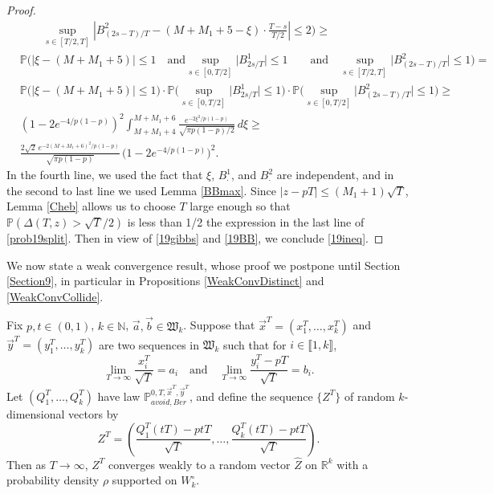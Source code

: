 \begin{proof}
\begin{equation}
\begin{split}
	&\qquad  \sup_{s\in[T/2,T]}\left|B^2_{(2s-T)/T}-(M+M_1+5-\xi)\cdot\frac{T-s}{T/2}\right| \leq 2 \bigg) \geq \\
	& \mathbb{P}\bigg(|\xi - (M+M_1+5)|\leq 1 \quad\mathrm{and} \sup_{s\in[0,T/2]}\big|B^1_{2s/T}\big| \leq 1 \qquad \mathrm{and}\quad \sup_{s\in[T/2,T]}\big|B^2_{(2s-T)/T}\big| \leq 1 \bigg) =\\
	& \mathbb{P}\Big(|\xi-(M+M_1+5)|\leq 1\Big)\cdot \mathbb{P}\bigg(\sup_{s\in[0,T/2]} \big|B^1_{2s/T}\big|\leq 1\bigg)\cdot \mathbb{P}\bigg(\sup_{s\in[0,T/2]} \big|B^2_{(2s-T)/T}\big|\leq 1\bigg) \geq\\
	& \left(1-2e^{-4/p(1-p)}\right)^2 \int_{M+M_1+4}^{M+M_1+6} \frac{e^{-2\xi^2/p(1-p)}}{\sqrt{\pi p(1-p)/2}}\,d\xi \geq\\
	& \frac{2\sqrt{2}\,e^{-2(M+M_1+6)^2/p(1-p)}}{\sqrt{\pi p(1-p)}}\,\big(1-2e^{-4/p(1-p)}\big)^2.
	\end{split}
	\end{equation}
	In the fourth line, we used the fact that $\xi$, $B^1_\cdot$, and $B^2_\cdot$ are independent, and in the second to last line we used Lemma \ref{BBmax}. Since $|z-pT|\leq (M_1+1)\sqrt{T}$, Lemma \ref{Cheb} allows us to choose $T$ large enough so that $\mathbb{P}(\Delta(T,z) > \sqrt{T}/2)$ is less than 1/2 the expression in the last line of \eqref{prob19split}. Then in view of \eqref{19gibbs} and \eqref{19BB}, we conclude \eqref{19ineq}.
	
\end{proof}

We now state a weak convergence result, whose proof we postpone until Section \ref{Section9}, in particular in Propositions \ref{WeakConvDistinct} and \ref{WeakConvCollide}.

\begin{lemma}\label{prob17}
Fix $p,t\in(0,1)$, $k\in\mathbb{N}$, $\vec a, \vec b\in \mathfrak{W}_k$.  Suppose that $\vec{x}^{T}=(x_{1}^{T},\dots,x_{k}^{T})$ and $\vec{y}^{T}=(y_{1}^{T},\dots,y_{k}^{T})$ are two sequences in $\mathfrak{W}_k$ such that for $i\in \llbracket 1,k\rrbracket$, $$\lim_{T\rightarrow\infty}\frac{x_{i}^{T}}{\sqrt{T}}=a_{i} \quad \text{and} \quad \lim_{T\rightarrow\infty}\frac{y_{i}^{T}-pT}{\sqrt{T}}=b_{i}.$$  Let $(Q_1^T,\dots,Q_k^T)$ have law $\mathbb{P}^{0,T,\vec{x}^{T},\vec{y}^{T}}_{avoid,Ber}$, and define the sequence $\{Z^T\}$ of random $k$-dimensional vectors by $$Z^{T}=\left(\frac{Q_{1}^T(tT)-ptT}{\sqrt{T}},\dots,\frac{Q_{k}^T(tT)-ptT}{\sqrt{T}}\right).$$ Then as $T\to\infty$, $Z^{T}$ converges weakly to a random vector $\hat Z$ on $\mathbb{R}^k$ with a probability density $\rho$ supported on $W_k^\circ$.
\end{lemma}

